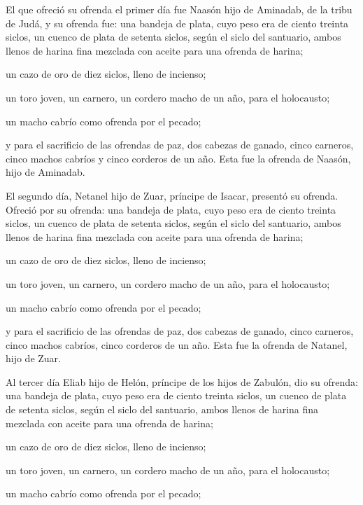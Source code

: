 \begin{paracol}{2}
 El que ofreció su ofrenda el primer día fue Naasón hijo
de Aminadab, de la tribu de Judá,  y su ofrenda fue: una
bandeja de plata, cuyo peso era de ciento treinta siclos, un cuenco de
plata de setenta siclos, según el siclo del santuario, ambos llenos de
harina fina mezclada con aceite para una ofrenda de harina;

 un cazo de oro de diez siclos, lleno de incienso;

 un toro joven, un carnero, un cordero macho de un año,
para el holocausto;

 un macho cabrío como ofrenda por el pecado;

 y para el sacrificio de las ofrendas de paz, dos cabezas
de ganado, cinco carneros, cinco machos cabríos y cinco corderos de un
año. Esta fue la ofrenda de Naasón, hijo de Aminadab.

 El segundo día, Netanel hijo de Zuar, príncipe de
Isacar, presentó su ofrenda.  Ofreció por su ofrenda: una
bandeja de plata, cuyo peso era de ciento treinta siclos, un cuenco de
plata de setenta siclos, según el siclo del santuario, ambos llenos de
harina fina mezclada con aceite para una ofrenda de harina;

 un cazo de oro de diez siclos, lleno de incienso;

 un toro joven, un carnero, un cordero macho de un año,
para el holocausto;

 un macho cabrío como ofrenda por el pecado;

 y para el sacrificio de las ofrendas de paz, dos cabezas
de ganado, cinco carneros, cinco machos cabríos, cinco corderos de un
año. Esta fue la ofrenda de Natanel, hijo de Zuar.

 Al tercer día Eliab hijo de Helón, príncipe de los hijos
de Zabulón,  dio su ofrenda: una bandeja de plata, cuyo
peso era de ciento treinta siclos, un cuenco de plata de setenta siclos,
según el siclo del santuario, ambos llenos de harina fina mezclada con
aceite para una ofrenda de harina;

 un cazo de oro de diez siclos, lleno de incienso;

 un toro joven, un carnero, un cordero macho de un año,
para el holocausto;

 un macho cabrío como ofrenda por el pecado;


\end{paracol}
